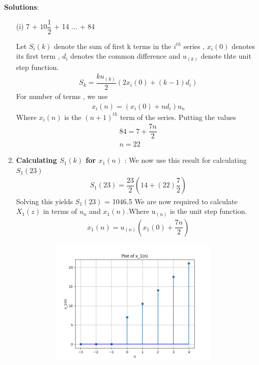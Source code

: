 \documentclass[journal,12pt,twocolumn]{IEEEtran}
\theoremstyle{remark}
\begin{document}
\vspace{0.5cm}
\textbf{Solutions}:
\begin{enumerate}
\item[(i)]   
7 + $10\dfrac{1}{2}$ + 14 ... + 84\vspace{0.05cm}
\vspace{0.2cm}

Let $S_i{(k)}$ denote the sum of first k terms in the $i^{th}$ series , $x_i(0)$ denotes its first term , $d_i$ denotes the common difference and $u_{(k)}$ denote thte unit step function.
\begin{align}
{S_k} = \dfrac{ku_{(k)}}{2}(2x_i(0) + (k-1)d_i)\label{eq:1}
\end{align}
For number of terms , we use
\begin{align}
x_i(n) = (x_i(0) + nd_i)u_n\label{eq:2}
\end{align}
Where $x_i(n)$ is the $(n+1)^{th}$ term of the series. Putting the values
\begin{align}  
84 = 7+\dfrac{7n}{2}\\
n=22
\end{align}
\item 
\textbf{Calculating $S_1(k)$ for $x_1(n)$} : 
We now use this result for calculating $S_1(23)$
\begin{align}
    S_1{(23)} = \dfrac{23}{2}(14+(22)\dfrac{7}{2})
    \end{align}
Solving this yields $S_1{(23)}$ = 1046.5\vspace{0.05cm}\vspace{0.05cm}
We are now required to calculate $X_1(z)$ in terms of $u_n$ and $x_1(n)$.Where u$_{(n)}$ is the unit step function.
\begin{align}
    x_1(n) = u_{(n)}(x_1(0)+\dfrac{7n}{2})
    \end{align}
    \begin{figure}[!ht]
    \centering
\graphicspath{ {figs/} }
\includegraphics[width=10cm, height=6cm]{graph_1}

\end{figure}
\end{enumerate}
\end{document}
